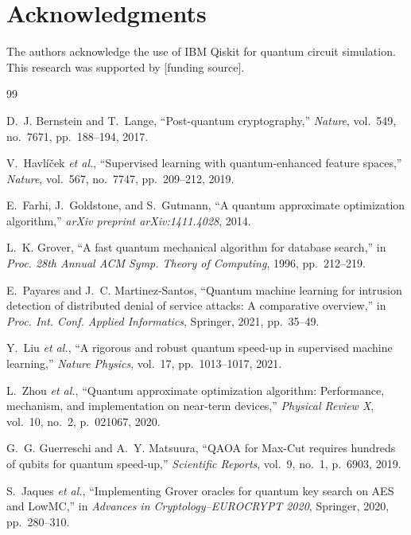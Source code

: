 \documentclass[conference]{IEEEtran}
\begin{document}
\section*{Acknowledgments}
The authors acknowledge the use of IBM Qiskit for quantum circuit simulation. This research was supported by [funding source].

\begin{thebibliography}{99}

D.~J. Bernstein and T.~Lange, ``Post-quantum cryptography,'' \textit{Nature}, vol.~549, no.~7671, pp.~188--194, 2017.

V.~Havl\'{i}\v{c}ek \textit{et al.}, ``Supervised learning with quantum-enhanced feature spaces,'' \textit{Nature}, vol.~567, no.~7747, pp.~209--212, 2019.

E.~Farhi, J.~Goldstone, and S.~Gutmann, ``A quantum approximate optimization algorithm,'' \textit{arXiv preprint arXiv:1411.4028}, 2014.

L.~K. Grover, ``A fast quantum mechanical algorithm for database search,'' in \textit{Proc. 28th Annual ACM Symp. Theory of Computing}, 1996, pp.~212--219.

E.~Payares and J.~C. Martinez-Santos, ``Quantum machine learning for intrusion detection of distributed denial of service attacks: A comparative overview,'' in \textit{Proc. Int. Conf. Applied Informatics}, Springer, 2021, pp.~35--49.

Y.~Liu \textit{et al.}, ``A rigorous and robust quantum speed-up in supervised machine learning,'' \textit{Nature Physics}, vol.~17, pp.~1013--1017, 2021.

L.~Zhou \textit{et al.}, ``Quantum approximate optimization algorithm: Performance, mechanism, and implementation on near-term devices,'' \textit{Physical Review X}, vol.~10, no.~2, p.~021067, 2020.

G.~G. Guerreschi and A.~Y. Matsuura, ``QAOA for Max-Cut requires hundreds of qubits for quantum speed-up,'' \textit{Scientific Reports}, vol.~9, no.~1, p.~6903, 2019.

S.~Jaques \textit{et al.}, ``Implementing Grover oracles for quantum key search on AES and LowMC,'' in \textit{Advances in Cryptology--EUROCRYPT 2020}, Springer, 2020, pp.~280--310.

\end{thebibliography}
\end{document}
